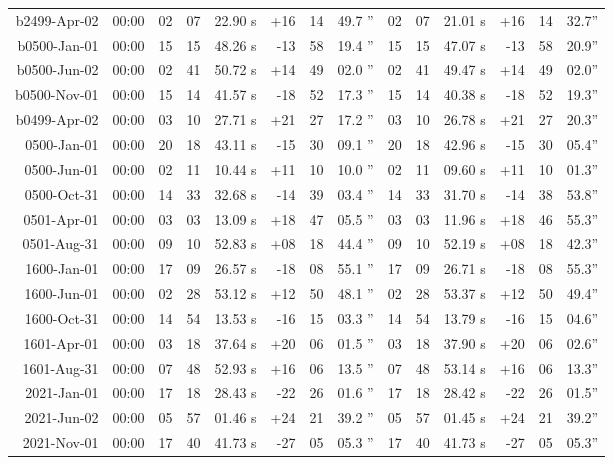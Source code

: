 \begin{longtable}{r@{\,}r|r@{h}r@{m}r<{s}|r@{°}r@{'}r<{''}||r@{h}r@{m}r<{s}|r@{°}r@{'}r<{''}}
b2499-Apr-02 & 00:00  &   02 & 07 & 22.90 & +16 & 14 & 49.7 & 02&07&21.01 & +16&14&32.7\\ %
b0500-Jan-01 & 00:00  &   15 & 15 & 48.26 & -13 & 58 & 19.4 & 15&15&47.07 & -13&58&20.9\\ %
b0500-Jun-02 & 00:00  &   02 & 41 & 50.72 & +14 & 49 & 02.0 & 02&41&49.47 & +14&49&02.0\\ %
b0500-Nov-01 & 00:00  &   15 & 14 & 41.57 & -18 & 52 & 17.3 & 15&14&40.38 & -18&52&19.3\\ %
b0499-Apr-02 & 00:00  &   03 & 10 & 27.71 & +21 & 27 & 17.2 & 03&10&26.78 & +21&27&20.3\\ %
 0500-Jan-01 & 00:00  &   20 & 18 & 43.11 & -15 & 30 & 09.1 & 20&18&42.96 & -15&30&05.4\\ %
 0500-Jun-01 & 00:00  &   02 & 11 & 10.44 & +11 & 10 & 10.0 & 02&11&09.60 & +11&10&01.3\\ %
 0500-Oct-31 & 00:00  &   14 & 33 & 32.68 & -14 & 39 & 03.4 & 14&33&31.70 & -14&38&53.8\\ %
 0501-Apr-01 & 00:00  &   03 & 03 & 13.09 & +18 & 47 & 05.5 & 03&03&11.96 & +18&46&55.3\\ %
 0501-Aug-31 & 00:00  &   09 & 10 & 52.83 & +08 & 18 & 44.4 & 09&10&52.19 & +08&18&42.3\\ %
 1600-Jan-01 & 00:00  &   17 & 09 & 26.57 & -18 & 08 & 55.1 & 17&09&26.71 & -18&08&55.3\\ %
 1600-Jun-01 & 00:00  &   02 & 28 & 53.12 & +12 & 50 & 48.1 & 02&28&53.37 & +12&50&49.4\\ %
 1600-Oct-31 & 00:00  &   14 & 54 & 13.53 & -16 & 15 & 03.3 & 14&54&13.79 & -16&15&04.6\\ %
 1601-Apr-01 & 00:00  &   03 & 18 & 37.64 & +20 & 06 & 01.5 & 03&18&37.90 & +20&06&02.6\\ %
 1601-Aug-31 & 00:00  &   07 & 48 & 52.93 & +16 & 06 & 13.5 & 07&48&53.14 & +16&06&13.3\\ %
 2021-Jan-01 & 00:00  &   17 & 18 & 28.43 & -22 & 26 & 01.6 & 17&18&28.42 & -22&26&01.5\\ %
 2021-Jun-02 & 00:00  &   05 & 57 & 01.46 & +24 & 21 & 39.2 & 05&57&01.45 & +24&21&39.2\\ %
 2021-Nov-01 & 00:00  &   17 & 40 & 41.73 & -27 & 05 & 05.3 & 17&40&41.73 & -27&05&05.3\\ %

\end{longtable}

